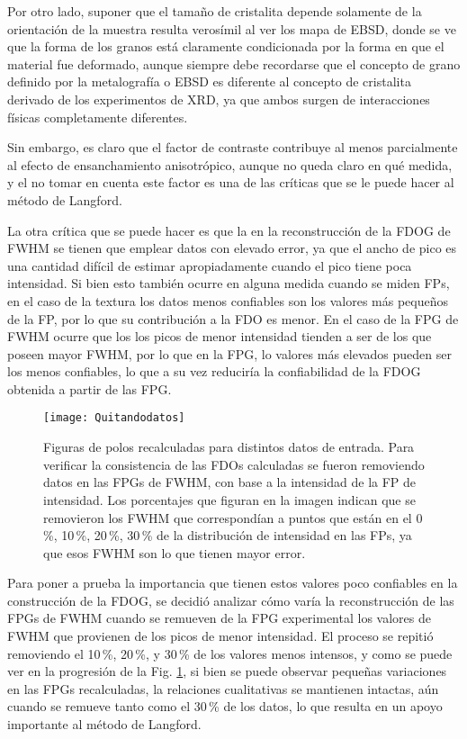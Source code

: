Por otro lado, suponer que el tamaño de cristalita depende solamente de la orientación de la muestra resulta verosímil al ver los mapa de EBSD, donde se ve que la forma de los granos está claramente condicionada por la forma en que el material fue deformado, aunque siempre debe recordarse que el concepto de grano definido por la metalografía o EBSD es diferente al concepto de cristalita derivado de los experimentos de XRD, ya que ambos surgen de interacciones físicas completamente diferentes.

Sin embargo, es claro que el factor de contraste contribuye al menos parcialmente al efecto de ensanchamiento anisotrópico, aunque no queda claro en qué medida, y el no tomar en cuenta este factor es una de las críticas que se le puede hacer al método de Langford.

La otra crítica que se puede hacer es que la en la reconstrucción de la FDOG de FWHM se tienen que emplear datos con elevado error, ya que el ancho de pico es una cantidad difícil de estimar apropiadamente cuando el pico tiene poca intensidad.
Si bien esto también ocurre en alguna medida cuando se miden FPs, en el caso de la textura los datos menos confiables son los valores más pequeños de la FP, por lo que su contribución a la FDO es menor.
En el caso de la FPG de FWHM ocurre que los los picos de menor intensidad tienden a ser de los que poseen mayor FWHM, por  lo que en la FPG, lo valores más elevados pueden ser los menos confiables, lo que a su vez reduciría la confiabilidad de la FDOG obtenida a partir de las FPG.

\begin{figure}[!htb]
  \centering
  \texttt{[image: Quitandodatos]}
  \caption{Figuras de polos recalculadas para distintos datos de entrada. Para verificar la consistencia de las FDOs calculadas se fueron removiendo datos en las FPGs de FWHM, con base a la intensidad de la FP de intensidad. Los porcentajes que figuran en la imagen indican que se removieron los FWHM que correspondían a puntos que están en el 0\,\%, 10\,\%, 20\,\%, 30\,\% de la distribución de intensidad en las FPs, ya que esos FWHM son lo que tienen mayor error.}
  \label{fig:IFFWHMRecvsCrop}
\end{figure}

Para poner a prueba la importancia que tienen estos valores poco confiables en la construcción de la FDOG, se decidió analizar cómo varía la reconstrucción de las FPGs de FWHM cuando se remueven de la FPG experimental los valores de FWHM que provienen de los picos de menor intensidad.
El proceso se repitió removiendo el 10\,\%, 20\,\%, y 30\,\% de los valores menos intensos, y como se puede ver en la progresión de la Fig. \ref{fig:IFFWHMRecvsCrop}, si bien se puede observar pequeñas variaciones en las FPGs recalculadas, la relaciones cualitativas se mantienen intactas, aún cuando se remueve tanto como el 30\,\% de los datos, lo que resulta en un apoyo importante al método de Langford.

